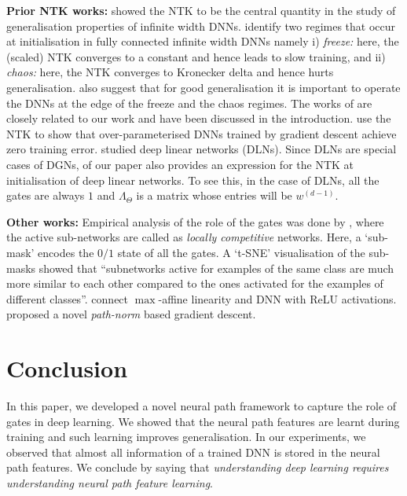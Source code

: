 \documentclass{article}
\begin{document}
\textbf{Prior NTK works:} \cite{ntk} showed the NTK to be the central quantity in the study of generalisation properties of infinite width DNNs. \cite{jacot2019freeze} identify two regimes that occur at initialisation in fully connected infinite width DNNs namely i) \emph{freeze:} here, the (scaled) NTK converges to a constant and hence leads to slow training,  and  ii) \emph{chaos:} here, the NTK converges to Kronecker delta and hence hurts generalisation. \cite{jacot2019freeze} also suggest that for good generalisation it is important to operate the DNNs at the edge of the freeze and the chaos regimes. The works of \cite{arora2019exact,cao2019generalization} are closely related to our work and have been discussed in the introduction.
\cite{dudnn} use the NTK to show that over-parameterised DNNs trained by gradient descent achieve zero training error. \cite{dudln,shamir,ganguli} studied deep linear networks (DLNs). Since DLNs are special cases of DGNs,  of our paper also provides an expression for the NTK at initialisation of deep linear networks. To see this, in the case of DLNs, all the gates are always $1$ and $\Lambda_{\Theta}$ is a matrix whose entries will be $w^{(d-1)}$. 

\textbf{Other works:} Empirical analysis of the role of the gates was done by \cite{srivastava2014understanding}, where the active sub-networks are called as \emph{locally competitive} networks. Here, a `sub-mask' encodes the $0/1$ state of all the gates. A `t-SNE' visualisation of the sub-masks showed that ``subnetworks active for examples of the same class are much more similar to each other compared to the ones activated for the examples of different classes''. \cite{balestriero2018spline}  connect $\max$-affine linearity and DNN with ReLU activations. \cite{neyshabur2015path} proposed a novel \emph{path-norm} based gradient descent. 

\section{Conclusion}
In this paper, we developed a novel neural path framework to capture the role of gates in deep learning. We showed that the neural path features are learnt during training and such learning improves generalisation. In our experiments, we observed that almost all information of a trained DNN is stored in the neural path features. We conclude by saying that \emph{understanding deep learning requires understanding neural path feature learning}. 
\end{document}
